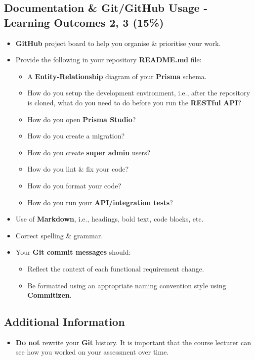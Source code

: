 \documentclass{article}
\begin{document}
\subsection*{Documentation \& Git/GitHub Usage - Learning Outcomes 2, 3 (15\%)}
\begin{itemize}
	\item \textbf{GitHub} project board to help you organise \& prioritise your work. 
	\item Provide the following in your repository \textbf{README.md} file:
	\begin{itemize}
		\item A \textbf{Entity-Relationship} diagram of your \textbf{Prisma} schema.
		\item How do you setup the development environment, i.e., after the repository is cloned, what do you need to do before you run the \textbf{RESTful API}?
		\item How do you open \textbf{Prisma Studio}?
		\item How do you create a migration?
		\item How do you create \textbf{super admin} users?
		\item How do you lint \& fix your code?
		\item How do you format your code?
		\item How do you run your \textbf{API/integration tests}?
	\end{itemize}
	\item Use of \textbf{Markdown}, i.e., headings, bold text, code blocks, etc.
	\item Correct spelling \& grammar. 
	\item Your \textbf{Git commit messages} should:
	\begin{itemize}
		\item Reflect the context of each functional requirement change.
		\item Be formatted using an appropriate naming convention style using \textbf{Commitizen}.
	\end{itemize}	
\end{itemize}

\subsection*{Additional Information}
\begin{itemize}
	\item \textbf{Do not} rewrite your \textbf{Git} history. It is important that the course lecturer can see how you worked on your assessment over time.
\end{itemize}
\end{document}
